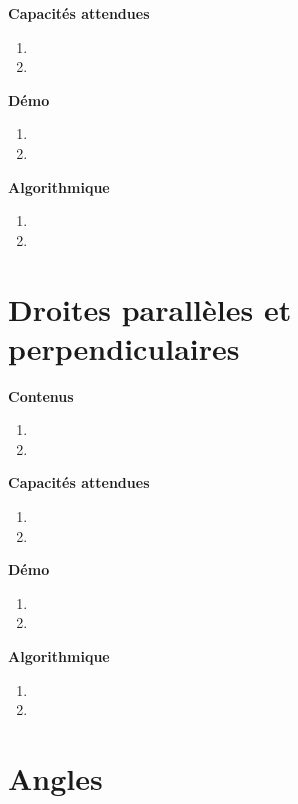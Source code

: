 \documentclass[10pt,a4paper]{article}
\begin{document}
\textbf{Capacités attendues}

\begin{enumerate}
\item 
\item 
\end{enumerate}

\textbf{Démo}

\begin{enumerate}
\item 
\item 
\end{enumerate}

\textbf{Algorithmique}

\begin{enumerate}
\item 
\item 
\end{enumerate}

\section{Droites parallèles et perpendiculaires}

\textbf{Contenus}

\begin{enumerate} 
\item 
\item 
\end{enumerate}


\textbf{Capacités attendues}

\begin{enumerate}
\item 
\item 
\end{enumerate}

\textbf{Démo}

\begin{enumerate}
\item 
\item 
\end{enumerate}

\textbf{Algorithmique}

\begin{enumerate}
\item 
\item 
\end{enumerate}

\section{Angles}
\end{document}

